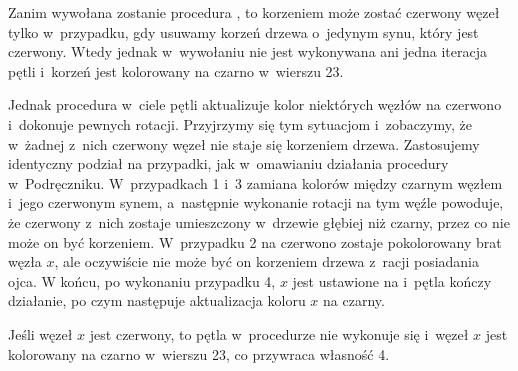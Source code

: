 \vspace{-2ex}

\exercise %
Zanim wywołana zostanie procedura , to korzeniem może zostać czerwony węzeł tylko w~przypadku, gdy usuwamy korzeń drzewa o~jedynym synu, który jest czerwony.
Wtedy jednak w~wywołaniu  nie jest wykonywana ani jedna iteracja pętli  i~korzeń jest kolorowany na czarno w~wierszu 23.

Jednak procedura  w~ciele pętli aktualizuje kolor niektórych węzłów na czerwono i~dokonuje pewnych rotacji.
Przyjrzymy się tym sytuacjom i~zobaczymy, że w~żadnej z~nich czerwony węzeł nie staje się korzeniem drzewa.
Zastosujemy identyczny podział na przypadki, jak w~omawianiu działania procedury w~Podręczniku.
W~przypadkach 1 i~3 zamiana kolorów między czarnym węzłem i~jego czerwonym synem, a~następnie wykonanie rotacji na tym węźle powoduje, że czerwony z~nich zostaje umieszczony w~drzewie głębiej niż czarny, przez co nie może on być korzeniem.
W~przypadku 2 na czerwono zostaje pokolorowany brat węzła $x$, ale oczywiście nie może być on korzeniem drzewa z~racji posiadania ojca.
W końcu, po wykonaniu przypadku 4, $x$ jest ustawione na  i~pętla kończy działanie, po czym następuje aktualizacja koloru $x$ na czarny.

\exercise %
Jeśli węzeł $x$ jest czerwony, to pętla  w~procedurze  nie wykonuje się i~węzeł $x$ jest kolorowany na czarno w~wierszu 23, co przywraca własność 4.

